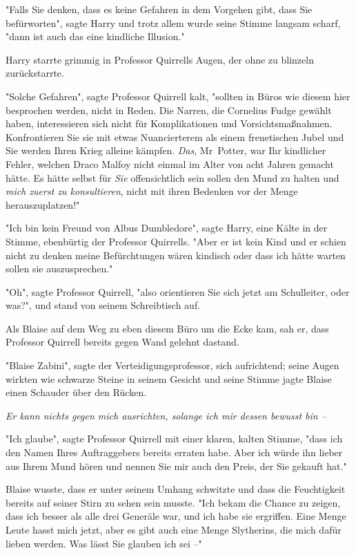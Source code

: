 {"Falls Sie denken, dass es keine Gefahren in dem Vorgehen gibt, dass Sie befürworten", sagte Harry und trotz allem wurde seine Stimme langsam scharf, "dann ist auch das eine kindliche Illusion."

Harry starrte grimmig in Professor Quirrells Augen, der ohne zu blinzeln zurückstarrte.

"Solche Gefahren", sagte Professor Quirrell kalt, "sollten in Büros wie diesem hier besprochen werden, nicht in Reden. Die Narren, die Cornelius Fudge gewählt haben, interessieren sich nicht für Komplikationen und Vorsichtsmaßnahmen. Konfrontieren Sie sie mit etwas Nuancierterem als einem frenetischen Jubel und Sie werden Ihren Krieg alleine kämpfen. \emph{Das}, Mr~Potter, war Ihr kindlicher Fehler, welchen Draco Malfoy nicht einmal im Alter von acht Jahren gemacht hätte. Es hätte selbst für \emph{Sie} offensichtlich sein sollen den Mund zu halten und \emph{mich zuerst zu konsultieren}, nicht mit ihren Bedenken vor der Menge herauszuplatzen!"

"Ich bin kein Freund von Albus Dumbledore", sagte Harry, eine Kälte in der Stimme, ebenbürtig der Professor Quirrells. "Aber er ist kein Kind und er schien nicht zu denken meine Befürchtungen wären kindisch oder dass ich hätte warten sollen sie auszusprechen."

"Oh", sagte Professor Quirrell, "also orientieren Sie sich jetzt am Schulleiter, oder was?", und stand von seinem Schreibtisch auf.

Als Blaise auf dem Weg zu eben diesem Büro um die Ecke kam, sah er, dass Professor Quirrell bereits gegen Wand gelehnt dastand.

"Blaise Zabini", sagte der Verteidigungsprofessor, sich aufrichtend; seine Augen wirkten wie schwarze Steine in seinem Gesicht und seine Stimme jagte Blaise einen Schauder über den Rücken.

\emph{Er kann nichts gegen mich ausrichten, solange ich mir dessen bewusst bin --}

"Ich glaube", sagte Professor Quirrell mit einer klaren, kalten Stimme, "dass ich den Namen Ihres Auftraggebers bereits erraten habe. Aber ich würde ihn lieber aus Ihrem Mund hören und nennen Sie mir auch den Preis, der Sie gekauft hat."

Blaise wusste, dass er unter seinem Umhang schwitzte und dass die Feuchtigkeit bereits auf seiner Stirn zu sehen sein musste. "Ich bekam die Chance zu zeigen, dass ich besser als alle drei Generäle war, und ich habe sie ergriffen. Eine Menge Leute hasst mich jetzt, aber es gibt auch eine Menge Slytherins, die mich dafür lieben werden. Was lässt Sie glauben ich sei --"

}
